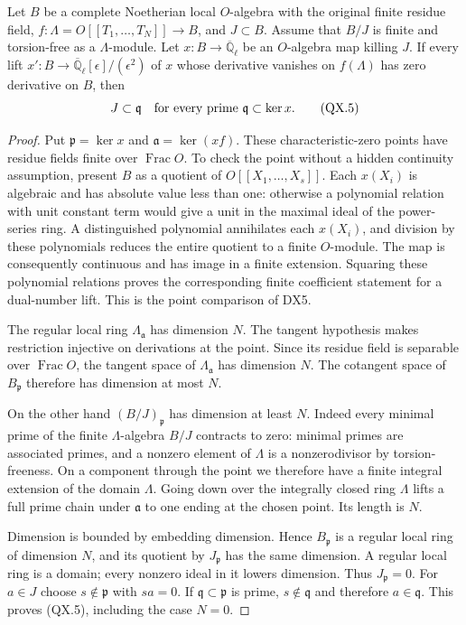 \begin{lemma}
\label{claim:QX2}
Let $B$ be a complete Noetherian local $O$-algebra with the original
finite residue field, $f:\Lambda=O[[T_1,\ldots,T_N]]\to B$, and
$J\subset B$.  Assume that $B/J$ is finite and torsion-free as a
$\Lambda$-module.  Let $x:B\to\overline{\mathbb Q}_\ell$ be an
$O$-algebra map killing $J$.  If every lift
$x':B\to\overline{\mathbb Q}_\ell[\epsilon]/(\epsilon^2)$ of $x$
whose derivative vanishes on $f(\Lambda)$ has zero derivative on
$B$, then
\[
       J\subset\mathfrak q
       \quad\hbox{for every prime }
       \mathfrak q\subset\ker x.
       \tag{QX.5}
\]
\end{lemma}
\begin{proof}
Put $\mathfrak p=\ker x$ and
$\mathfrak a=\ker(xf)$.  These characteristic-zero points have
residue fields finite over $\operatorname{Frac}O$.  To check the
point without a hidden continuity assumption, present $B$ as a
quotient of $O[[X_1,\ldots,X_s]]$.  Each $x(X_i)$ is algebraic and
has absolute value less than one: otherwise a polynomial relation
with unit constant term would give a unit in the maximal ideal of
the power-series ring.  A distinguished polynomial annihilates
each $x(X_i)$, and division by these polynomials reduces the entire
quotient to a finite $O$-module.  The map is consequently continuous
and has image in a finite extension.  Squaring these polynomial
relations proves the corresponding finite coefficient statement
for a dual-number lift.  This is the point comparison of DX5.

The regular local ring $\Lambda_{\mathfrak a}$ has dimension $N$.
The tangent hypothesis makes restriction injective on derivations
at the point.  Since its residue field is separable over
$\operatorname{Frac}O$, the tangent space of
$\Lambda_{\mathfrak a}$ has dimension $N$.  The cotangent space
of $B_{\mathfrak p}$ therefore has dimension at most $N$.

On the other hand $(B/J)_{\mathfrak p}$ has dimension at least
$N$.  Indeed every minimal prime of the finite
$\Lambda$-algebra $B/J$ contracts to zero: minimal primes are
associated primes, and a nonzero element of $\Lambda$ is a
nonzerodivisor by torsion-freeness.  On a component through the
point we therefore have a finite integral extension of the domain
$\Lambda$.  Going down over the integrally closed ring $\Lambda$
lifts a full prime chain under $\mathfrak a$ to one ending at the
chosen point.  Its length is $N$.

Dimension is bounded by embedding dimension.  Hence
$B_{\mathfrak p}$ is a regular local ring of dimension $N$, and
its quotient by $J_{\mathfrak p}$ has the same dimension.  A regular
local ring is a domain; every nonzero ideal in it lowers dimension.
Thus $J_{\mathfrak p}=0$.  For $a\in J$ choose
$s\notin\mathfrak p$ with $sa=0$.  If
$\mathfrak q\subset\mathfrak p$ is prime, $s\notin\mathfrak q$
and therefore $a\in\mathfrak q$.  This proves (QX.5), including
the case $N=0$.
\end{proof}

